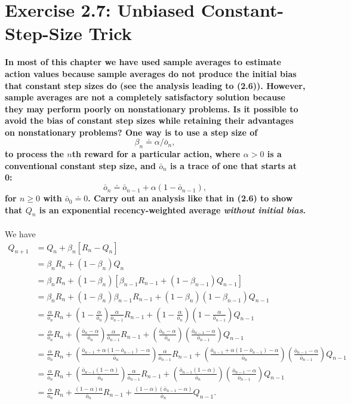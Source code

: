 \documentclass[a4paper,11pt]{article}
\numberwithin{equation}{section}
\theoremstyle{remark}
\begin{document}
\section{Exercise 2.7: Unbiased Constant-Step-Size Trick}

\textbf{In most of this chapter we have used sample averages to estimate action values because sample averages do not produce the initial bias that constant step sizes do (see the analysis leading to (2.6)). However, sample averages are not a completely satisfactory solution because they may perform poorly on nonstationary problems. Is it possible to avoid the bias of constant step sizes while retaining their advantages on nonstationary problems? One way is to use a step size of
\[
	\beta_n \doteq \alpha /  \bar{o}_n,
\]
to process the $n$th reward for a particular action, where $\alpha > 0$ is a conventional constant step size, and $\bar{o}_n$ is a trace of one that starts at 0:
\[
	\bar{o}_n \doteq \bar{o}_{n-1} + \alpha(1-\bar{o}_{n-1}), 	
\]
for $n\geq 0$ with $\bar{o}_0 \doteq 0$. Carry out an analysis like that in (2.6) to show that $Q_n$ is an exponential recency-weighted average \emph{without initial bias}.}
\\ \\ 
We have
\begin{align*}
	Q_{n+1} & = Q_n + \beta_n[R_n - Q_n] \\
	& = \beta_n R_n + (1-\beta_n) Q_n \\
	& = \beta_n R_n + (1-\beta_n)[\beta_{n-1} R_{n-1} + (1-\beta_{n-1}) Q_{n-1}] \\
	& = \beta_n R_n + (1-\beta_n)\beta_{n-1}R_{n-1} + (1-\beta_n)(1-\beta_{n-1})Q_{n-1} \\
	& = \frac{\alpha}{\bar{o}_n} R_n + \left(1-\frac{\alpha}{\bar{o}_n}\right)\frac{\alpha}{\bar{o}_{n-1}}R_{n-1} + \left(1-\frac{\alpha}{\bar{o}_n}\right)\left(1-\frac{\alpha}{\bar{o}_{n-1}}\right)Q_{n-1} \\
	& = \frac{\alpha}{\bar{o}_n} R_n + \left(\frac{\bar{o}_n - \alpha}{\bar{o}_n}\right)\frac{\alpha}{\bar{o}_{n-1}}R_{n-1} + \left(\frac{\bar{o}_n - \alpha}{\bar{o}_n}\right)\left(\frac{\bar{o}_{n-1} - \alpha}{\bar{o}_{n-1}}\right)Q_{n-1} \\
	& = \frac{\alpha}{\bar{o}_n} R_n + \left(\frac{\bar{o}_{n-1} + \alpha(1-\bar{o}_{n-1}) - \alpha}{\bar{o}_n}\right)\frac{\alpha}{\bar{o}_{n-1}}R_{n-1} + \left(\frac{\bar{o}_{n-1} + \alpha(1-\bar{o}_{n-1}) - \alpha}{\bar{o}_n}\right)\left(\frac{\bar{o}_{n-1} - \alpha}{\bar{o}_{n-1}}\right)Q_{n-1} \\
	& = \frac{\alpha}{\bar{o}_n} R_n + \left(\frac{\bar{o}_{n-1}(1 - \alpha)}{\bar{o}_n}\right)\frac{\alpha}{\bar{o}_{n-1}}R_{n-1} + \left(\frac{\bar{o}_{n-1}(1 - \alpha)}{\bar{o}_n}\right)\left(\frac{\bar{o}_{n-1} - \alpha}{\bar{o}_{n-1}}\right)Q_{n-1} \\	
	& = \frac{\alpha}{\bar{o}_n} R_n + \frac{(1-\alpha)\alpha}{\bar{o}_n} R_{n-1} + \frac{(1-\alpha)(\bar{o}_{n-1} - \alpha)}{\bar{o}_n}	Q_{n-1}.		
\end{align*}
\end{document}

